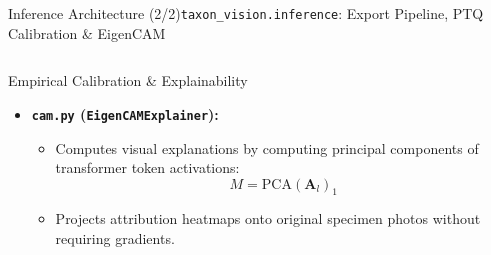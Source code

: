 \begin{frame}{Inference Architecture (2/2)}{\texttt{taxon\_vision.inference}: Export Pipeline, PTQ Calibration \& EigenCAM}
\begin{columns}[T]
\begin{column}{0.48\textwidth}
\begin{block}{Empirical Calibration \& Explainability}
\begin{itemize}
\begin{itemize}
                            \item \texttt{load\_calibration\_tensors()}: Loads representative specimen images from the calibration partition using production preprocessing transforms.
                            \item Enforces data integrity: strictly bans synthetic Gaussian noise to prevent clipping real activation distributions during PTQ.
                        \end{itemize}
                    \item \textbf{\texttt{cam.py} (\texttt{EigenCAMExplainer}):}
                        \begin{itemize}\tiny
                            \item Computes visual explanations by computing principal components of transformer token activations:
                                $$M = \text{PCA}(\mathbf{A}_{l})_1$$
                            \item Projects attribution heatmaps onto original specimen photos without requiring gradients.
                        \end{itemize}
                \end{itemize}
            \end{block}
        \end{column}
    \end{columns}

\end{frame}

